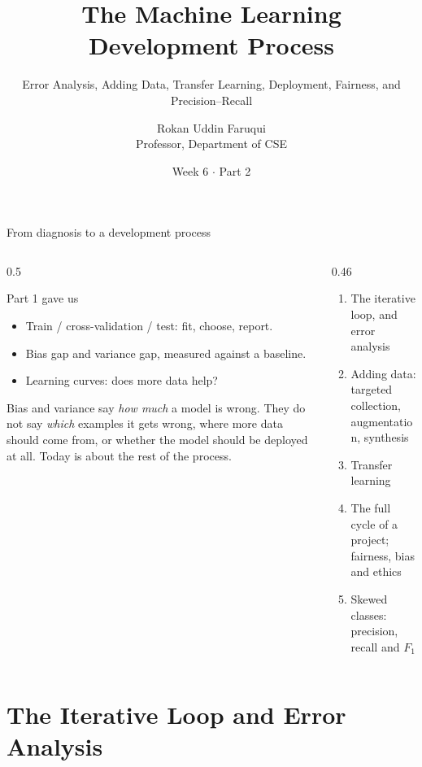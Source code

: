 \documentclass[aspectratio=169,10pt]{beamer}
\title[CSE 815 -- Week 6, Part 2]{The Machine Learning Development Process}
\subtitle{Error Analysis, Adding Data, Transfer Learning, Deployment, Fairness, and Precision--Recall}
\author{Rokan Uddin Faruqui\\ \small Professor, Department of CSE}
\institute{\small University of Chittagong \\ \texttt{rufaruqui@cu.ac.bd}}
\date[Week 6 / Part 2]{Week 6 $\cdot$ Part 2}
\begin{document}
\begin{frame}
  \titlepage
\end{frame}

\begin{frame}{From diagnosis to a development process}
  \begin{columns}[T,onlytextwidth]
    \begin{column}{0.5\textwidth}
      \begin{block}{Part 1 gave us}
        \footnotesize
        \begin{itemize}
          \item Train / cross-validation / test: fit, choose, report.
          \item Bias gap and variance gap, measured against a baseline.
          \item Learning curves: does more data help?
        \end{itemize}
      \end{block}
      \footnotesize
      Bias and variance say \emph{how much} a model is wrong. They do not say \emph{which}
      examples it gets wrong, where more data should come from, or whether the model should
      be deployed at all. Today is about the rest of the process.
    \end{column}
    \begin{column}{0.46\textwidth}
      \begin{keyidea}[Today]
        \footnotesize
        \begin{enumerate}
          \item The iterative loop, and error analysis
          \item Adding data: targeted collection, augmentation, synthesis
          \item Transfer learning
          \item The full cycle of a project; fairness, bias and ethics
          \item Skewed classes: precision, recall and $F_1$
        \end{enumerate}
      \end{keyidea}
    \end{column}
  \end{columns}
\end{frame}

\section{The Iterative Loop and Error Analysis}
\end{document}
